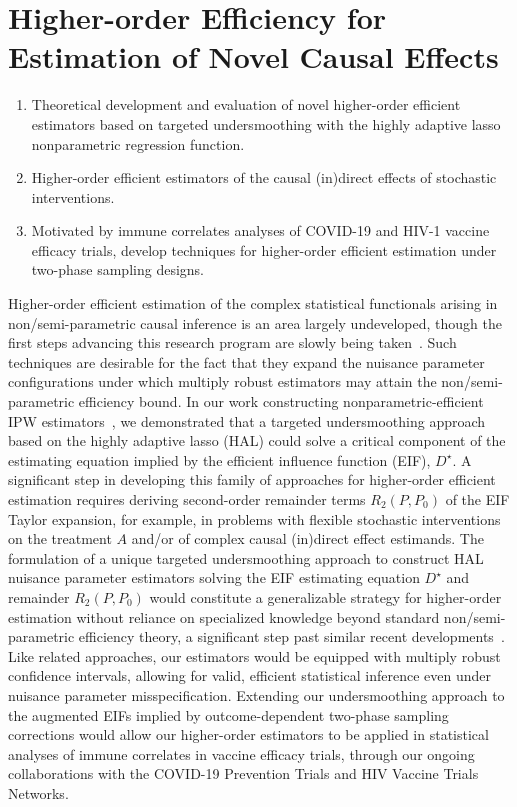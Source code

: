 \section{Higher-order Efficiency for Estimation of Novel Causal Effects}

\begin{enumerate}[label=(\alph*)]
  \itemsep0.2pt
  \item Theoretical development and evaluation of novel higher-order efficient
    estimators based on targeted undersmoothing with the highly adaptive lasso
    nonparametric regression function.
  \item Higher-order efficient estimators of the causal (in)direct effects of
    stochastic interventions.
  \item Motivated by immune correlates analyses of COVID-19 and HIV-1 vaccine
    efficacy trials, develop techniques for higher-order efficient estimation
    under two-phase sampling designs.
\end{enumerate}

Higher-order efficient estimation of the complex statistical functionals arising
in non/semi-parametric causal inference is an area largely undeveloped, though
the first steps advancing this research program are slowly being
taken~\citep{robins2008higher,carone2018higher}. Such techniques are desirable
for the fact that they expand the nuisance parameter configurations under which
multiply robust estimators may attain the non/semi-parametric efficiency bound.
In our work constructing nonparametric-efficient IPW
estimators~\citep{ertefaie2020nonparametric}, we demonstrated that a targeted
undersmoothing approach based on the highly adaptive lasso (HAL) could solve
a critical component of the estimating equation implied by the efficient
influence function (EIF), $D^{\star}$. A significant step in developing this
family of approaches for higher-order efficient estimation requires deriving
second-order remainder terms $R_2(P, P_0)$ of the EIF Taylor expansion, for
example, in problems with flexible stochastic interventions on the treatment
$A$ and/or of complex causal (in)direct effect estimands. The formulation of
a unique targeted undersmoothing approach to construct HAL nuisance parameter
estimators solving the EIF estimating equation $D^{\star}$ and remainder
$R_2(P, P_0)$ would constitute a generalizable strategy for higher-order
estimation without reliance on specialized knowledge beyond standard
non/semi-parametric efficiency theory, a significant step past similar recent
developments~\citep{vdl2017generally, benkeser2017doubly}. Like related
approaches, our estimators would be equipped with multiply robust confidence
intervals, allowing for valid, efficient statistical inference even under
nuisance parameter misspecification. Extending our undersmoothing approach to
the augmented EIFs implied by outcome-dependent two-phase sampling corrections
would allow our higher-order estimators to be applied in statistical analyses of
immune correlates in vaccine efficacy trials, through our ongoing collaborations
with the COVID-19 Prevention Trials and HIV Vaccine Trials Networks.

